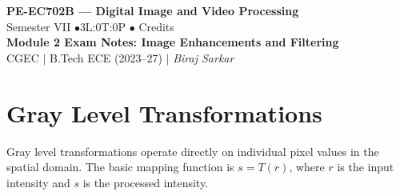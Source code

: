 \documentclass[12pt,a4paper]{article}
\begin{document}

\begin{center}
  {\LARGE\bfseries\color{myred} PE-EC702B --- Digital Image and Video Processing}\\[5pt]
  {\normalsize\color{mydark} Semester VII \quad$\bullet$\quad 3L:0T:0P \quad$\bullet$ Credits}\\[3pt]
  {\normalsize\color{myteal}\textbf{Module 2 Exam Notes: Image Enhancements and Filtering}}\\[3pt]
  {\small\color{mydark} CGEC \;$|$\; B.Tech ECE (2023--27) \;$|$\; \textit{Biraj Sarkar}}
\end{center}
\vspace{2pt}
\noindent{\color{myred}\rule{\linewidth}{1.5pt}}
\vspace{2pt}

\hypersetup{linkcolor=mydark}
\tableofcontents
\hypersetup{linkcolor=myteal}
\newpage

\section{Gray Level Transformations}

Gray level transformations operate directly on individual pixel values in the spatial domain. The basic mapping function is $s = T(r)$, where $r$ is the input intensity and $s$ is the processed intensity.
\end{document}
